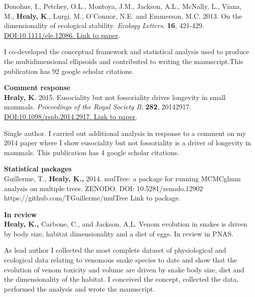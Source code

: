 \documentclass[10pt,a4paper]{article}
\begin{document}
\begin{flushleft}
\bigskip

\setlength{\parindent}{0mm}Donohue, I., Petchey, O.L., Montoya, J.M., Jackson, A.L., McNally, L., Viana, M., \textbf{Healy, K}., Lurgi, M., O’Connor, N.E. and Emmerson, M.C. 2013. On the dimensionality of ecological stability. \textit{Ecology Letters}. \textbf{16}, 421-429. \href{http://onlinelibrary.wiley.com/doi/10.1111/ele.12086/abstract} {DOI:10.1111/ele.12086. Link to paper}. 
\smallskip
\par{\fontsize{10.5}{10} I co-developed the conceptual framework and statistical analysis used to produce the multidimensional ellipsoids and contributed to writing the manuscript.This publication has 92 google scholar citations.}
\bigskip


\textbf{Comment response}\\
\setlength{\parindent}{0mm}\textbf{Healy, K}. 2015.  Eusociality but not fossoriality drives longevity in small mammals. \textit{Proceedings of the Royal Society B}, \textbf{282}, 20142917. \href{http://rspb.royalsocietypublishing.org/content/282/1806/20142917} {DOI:10.1098/rspb.2014.2917. Link to paper}. 
\smallskip
\par{\fontsize{10.5}{10} Single author. I carried out additional analysis in response to a comment on my 2014 paper where I show eusociality but not fossoriality is a driver of longevity in mammals. This publication has 4 google scholar citations.}


\textbf{Statistical packages}\\
\setlength{\parindent}{0mm} Guillerme, T., \textbf{Healy, K.,} 2014. mulTree: a package for running MCMCglmm analysis on multiple trees. ZENODO. DOI: 10.5281/zenodo.12902 {https://github.com/TGuillerme/mulTree Link to package}.


\bigskip

\textbf{In review}\\

\setlength{\parindent}{0mm}\textbf{Healy, K.,} Carbone, C., and Jackson, A.L. Venom evolution in snakes is driven by body size, habitat dimensionality and a diet of eggs. In review in PNAS.
\smallskip
\par{\fontsize{10.5}{10} As lead author I collected the most complete dataset of physiological and ecological data relating to venomous snake species to date and show that the evolution of venom toxicity and volume are driven by snake body size, diet and the dimensionality of the habitat. I conceived the concept, collected the data, performed the analysis and wrote the manuscript.}
\smallskip


\end{flushleft}
\end{document}
